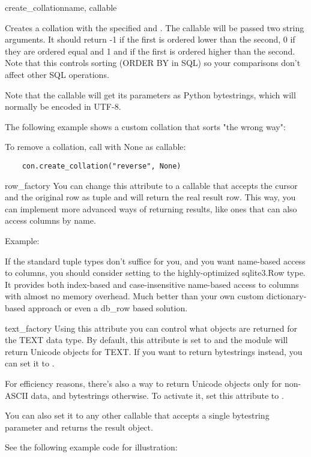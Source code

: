 \begin{methoddesc}{create_collation}{name, callable}

Creates a collation with the specified  and . The
callable will be passed two string arguments. It should return -1 if the first
is ordered lower than the second, 0 if they are ordered equal and 1 and if the
first is ordered higher than the second.  Note that this controls sorting
(ORDER BY in SQL) so your comparisons don't affect other SQL operations.

Note that the callable will get its parameters as Python bytestrings, which
will normally be encoded in UTF-8.

The following example shows a custom collation that sorts "the wrong way":

  

To remove a collation, call  with None as callable:

\begin{verbatim}
    con.create_collation("reverse", None)
\end{verbatim}
\end{methoddesc}


\begin{memberdesc}{row_factory}
  You can change this attribute to a callable that accepts the cursor and
  the original row as tuple and will return the real result row.  This
  way, you can implement more advanced ways of returning results, like
  ones that can also access columns by name.

  Example:

  

  If the standard tuple types don't suffice for you, and you want name-based
  access to columns, you should consider setting  to the
  highly-optimized sqlite3.Row type. It provides both
  index-based and case-insensitive name-based access to columns with almost
  no memory overhead. Much better than your own custom dictionary-based
  approach or even a db_row based solution.
\end{memberdesc}

\begin{memberdesc}{text_factory}
  Using this attribute you can control what objects are returned for the
  TEXT data type. By default, this attribute is set to  and
  the  module will return Unicode objects for TEXT. If you want to return
  bytestrings instead, you can set it to .

  For efficiency reasons, there's also a way to return Unicode objects only
  for non-ASCII data, and bytestrings otherwise. To activate it, set this
  attribute to .

  You can also set it to any other callable that accepts a single bytestring
  parameter and returns the result object.

  See the following example code for illustration:

  
\end{memberdesc}


